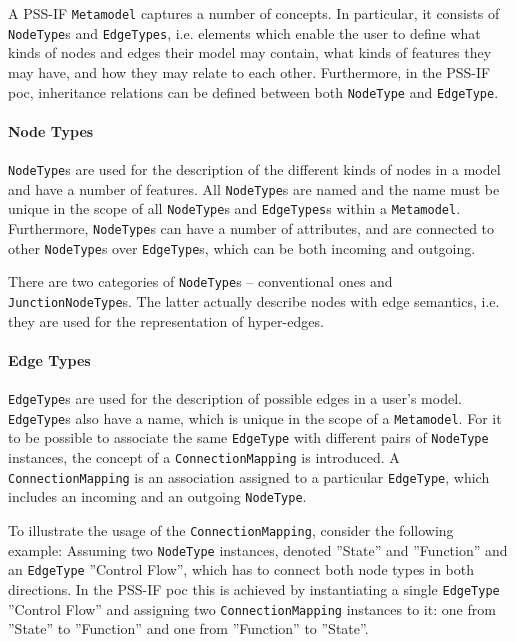 A PSS-IF \texttt{Metamodel} captures a number of concepts. In particular, it consists of \texttt{NodeType}s and \texttt{EdgeTypes}, i.e. elements which enable the user to define what kinds of nodes and edges their model may contain, what kinds of features they may have, and how they may relate to each other. Furthermore, in the PSS-IF \gls{poc}, inheritance relations can be defined between both \texttt{NodeType} and \texttt{EdgeType}.

\paragraph{Node Types}

\texttt{NodeType}s are used for the description of the different kinds of nodes in a model and have a number of features. All \texttt{NodeType}s are named and the name must be unique in the scope of all \texttt{NodeType}s and \texttt{EdgeTypes}s within a \texttt{Metamodel}. Furthermore, \texttt{NodeType}s can have a number of attributes, and are connected to other \texttt{NodeType}s over \texttt{EdgeType}s, which can be both incoming and outgoing.

There are two categories of \texttt{NodeType}s -- conventional ones and \texttt{JunctionNodeType}s. The latter actually describe nodes with edge semantics, i.e. they are used for the representation of hyper-edges.

\paragraph{Edge Types}

\texttt{EdgeType}s are used for the description of possible edges in a user's model. \texttt{EdgeType}s also have a name, which is unique in the scope of a \texttt{Metamodel}. For it to be possible to associate the same \texttt{EdgeType} with different pairs of \texttt{NodeType} instances, the concept of a \texttt{ConnectionMapping} is introduced. A \texttt{ConnectionMap\-ping} is an association assigned to a particular \texttt{EdgeType}, which includes an incoming and an outgoing \texttt{NodeType}.

To illustrate the usage of the \texttt{ConnectionMapping}, consider the following example: Assuming two \texttt{NodeType} instances, denoted ''State'' and ''Function'' and an \texttt{EdgeType} ''Control Flow'', which has to connect both node types in both directions. In the PSS-IF \gls{poc} this is achieved by instantiating a single \texttt{EdgeType} ''Control Flow'' and assigning two \texttt{ConnectionMapping} instances to it: one from ''State'' to ''Function'' and one from ''Function'' to ''State''.

